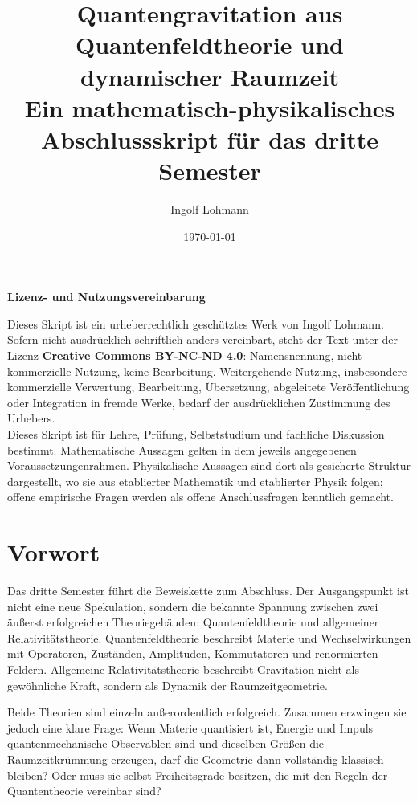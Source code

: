 \documentclass[11pt,a4paper]{book}
\title{\Huge Quantengravitation aus Quantenfeldtheorie und dynamischer Raumzeit\\[0.5em]\Large Ein mathematisch-physikalisches Abschlussskript für das dritte Semester}
\author{Ingolf Lohmann}
\date{\today}
\theoremstyle{remark}
\begin{document}
\frontmatter
\maketitle
\thispagestyle{empty}
\vspace*{2cm}
\begin{center}
\textbf{Lizenz- und Nutzungsvereinbarung}
\end{center}
Dieses Skript ist ein urheberrechtlich geschütztes Werk von Ingolf Lohmann. Sofern nicht ausdrücklich schriftlich anders vereinbart, steht der Text unter der Lizenz \textbf{Creative Commons BY-NC-ND 4.0}: Namensnennung, nicht-kommerzielle Nutzung, keine Bearbeitung. Weitergehende Nutzung, insbesondere kommerzielle Verwertung, Bearbeitung, Übersetzung, abgeleitete Veröffentlichung oder Integration in fremde Werke, bedarf der ausdrücklichen Zustimmung des Urhebers.\\

Dieses Skript ist für Lehre, Prüfung, Selbststudium und fachliche Diskussion bestimmt. Mathematische Aussagen gelten in dem jeweils angegebenen Voraussetzungenrahmen. Physikalische Aussagen sind dort als gesicherte Struktur dargestellt, wo sie aus etablierter Mathematik und etablierter Physik folgen; offene empirische Fragen werden als offene Anschlussfragen kenntlich gemacht.

\tableofcontents
\mainmatter

\chapter*{Vorwort}
Das dritte Semester führt die Beweiskette zum Abschluss. Der Ausgangspunkt ist nicht eine neue Spekulation, sondern die bekannte Spannung zwischen zwei äußerst erfolgreichen Theoriegebäuden: Quantenfeldtheorie und allgemeiner Relativitätstheorie. Quantenfeldtheorie beschreibt Materie und Wechselwirkungen mit Operatoren, Zuständen, Amplituden, Kommutatoren und renormierten Feldern. Allgemeine Relativitätstheorie beschreibt Gravitation nicht als gewöhnliche Kraft, sondern als Dynamik der Raumzeitgeometrie.

Beide Theorien sind einzeln außerordentlich erfolgreich. Zusammen erzwingen sie jedoch eine klare Frage: Wenn Materie quantisiert ist, Energie und Impuls quantenmechanische Observablen sind und dieselben Größen die Raumzeitkrümmung erzeugen, darf die Geometrie dann vollständig klassisch bleiben? Oder muss sie selbst Freiheitsgrade besitzen, die mit den Regeln der Quantentheorie vereinbar sind?
\end{document}
